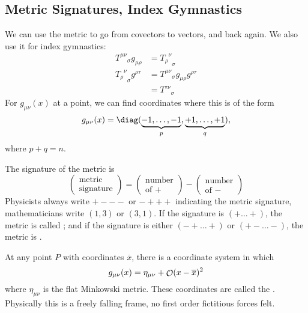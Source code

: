 

\subsection{Metric Signatures, Index Gymnastics}
We can use the metric to go from covectors to vectors, and back
again. We also use it for index gymnastics:
\begin{subequations}
\begin{align}
{T^{\mu\nu}}_{\sigma}g_{\mu\rho} &=
{{T_{\rho}}^{\nu}}_{\sigma}\\
{{T_{\rho}}^{\nu}}_{\sigma}g^{\rho\tau}
&={T^{\mu\nu}}_{\sigma}g_{\mu\rho}g^{\rho\tau}\\
&={T^{\tau\nu}}_{\sigma}
\end{align}
\end{subequations}
For $g_{\mu\nu}(x)$ at a point, we can find coordinates where
this is of the form
\begin{equation}
g_{\mu\nu}(x)=\diag(\underbrace{-1,\dots,-1}_{p},\underbrace{+1,\dots,+1}_{q}),
\end{equation}
where $p+q=n$.

The signature of the metric is 
\begin{equation}
\begin{pmatrix}\mbox{metric}\\
\mbox{signature}
\end{pmatrix}
=
\begin{pmatrix}\mbox{number}\\
\mbox{of $+$}
\end{pmatrix}
-\begin{pmatrix}\mbox{number}\\
\mbox{of $-$}
\end{pmatrix}
\end{equation}
Physicists always write $+---$ or $-+++$ indicating the metric
signature, mathematicians write $(1,3)$ or $(3,1)$. If the
signature is $(+\dots+)$, the metric is called
; and if the signature is either $(-+\dots+)$
or $(+-\dots-)$, the metric is .

At any point $P$ with coordinates $\overline{x}$, there is a
coordinate system in which
\begin{equation}
g_{\mu\nu}(x)=\eta_{\mu\nu}+\mathop{\mathcal{O}}\nolimits(x-\overline{x})^{2}
\end{equation}
where $\eta_{\mu\nu}$ is the flat Minkowski metric. These
coordinates are called the . Physically this is a freely falling frame, no
first order fictitious forces felt.


